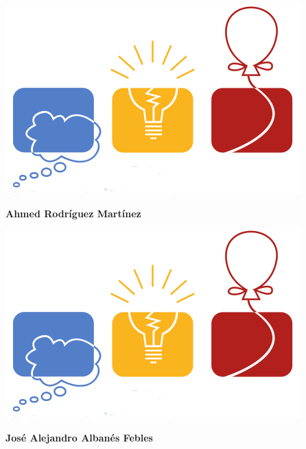 \begin{minipage}{0.2\textwidth}
	\includegraphics[width=\linewidth]{img/icpc.png} %
\end{minipage}
\hfill
\begin{minipage}{0.7\textwidth}
	\textbf{Ahmed Rodríguez Martínez}
	
\end{minipage}

\begin{minipage}{0.2\textwidth}
	\includegraphics[width=\linewidth]{img/icpc.png} %
\end{minipage}
\hfill
\begin{minipage}{0.7\textwidth}
	\textbf{José Alejandro Albanés Febles }
	
\end{minipage}


